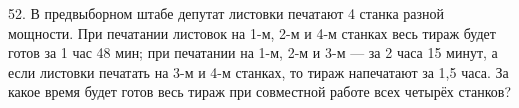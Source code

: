 52. В предвыборном штабе депутат листовки печатают 4 станка разной мощности. При печатании листовок на 1-м, 2-м и 4-м станках весь тираж будет готов за 1 час 48 мин; при печатании на 1-м, 2-м и 3-м --- за 2 часа 15 минут, а если листовки печатать на 3-м и 4-м станках, то тираж напечатают за 1,5 часа. За какое время будет готов весь тираж при совместной работе всех четырёх станков?\\

